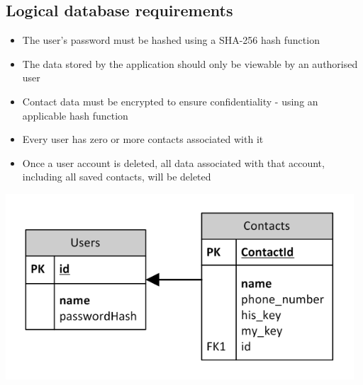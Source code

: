 \subsection{Logical database requirements}

\begin{itemize}
\item The user's password must be hashed using a SHA-256 hash function
\item The data stored by the application should only be viewable by an authorised user
\item Contact data must be encrypted to ensure confidentiality - using an applicable hash function
\item Every user has zero or more contacts associated with it
\item Once a user account is deleted, all data associated with that account, including all saved contacts, will be deleted
\end{itemize}
\begin{center}
 \includegraphics[width=13cm]{diagrams/LogicalDatabase.png}
\end{center}

